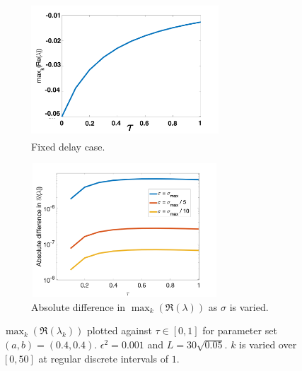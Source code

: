\begin{figure}[H]
    \centering
    \begin{subfigure}[b]{0.45\textwidth}
        \centering
        \includegraphics[width=7cm,height=5cm]{p3fixed.png}
        \caption{Fixed delay case.}
        \label{}
    \end{subfigure}
    \hfill
    \begin{subfigure}[b]{0.45\textwidth}
        \centering
        \includegraphics[width=7cm,height=5cm]{dispdiff2.png}
        \caption{Absolute difference in $\max_k(\Re(\lambda))$ as $\sigma$ is varied.}
        \label{}
    \end{subfigure}
    \caption{$\max_k(\Re(\lambda_k))$ plotted against $\tau\in[0,1]$ for parameter set $(a,b)=(0.4,0.4)$. $\epsilon^2=0.001$ and $L=30\sqrt{0.05}$. $k$ is varied over $[0,50]$ at regular discrete intervals of $1$.}
    \label{fig:p3}
\end{figure}

